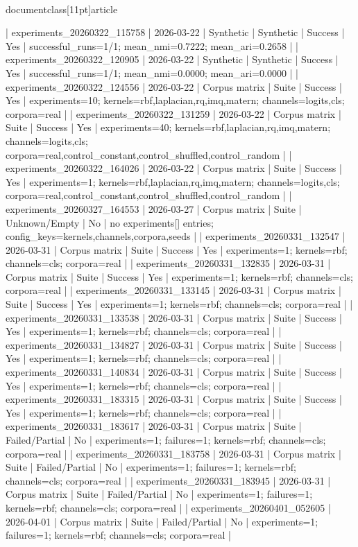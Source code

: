 \\documentclass[11pt]{article}
\begin{document}
\begin{CodeBlock}
| experiments_20260322_115758 | 2026-03-22 | Synthetic | Synthetic | Success | Yes | successful_runs=1/1; mean_nmi=0.7222; mean_ari=0.2658 |
| experiments_20260322_120905 | 2026-03-22 | Synthetic | Synthetic | Success | Yes | successful_runs=1/1; mean_nmi=0.0000; mean_ari=0.0000 |
| experiments_20260322_124556 | 2026-03-22 | Corpus matrix | Suite | Success | Yes | experiments=10; kernels=rbf,laplacian,rq,imq,matern; channels=logits,cls; corpora=real |
| experiments_20260322_131259 | 2026-03-22 | Corpus matrix | Suite | Success | Yes | experiments=40; kernels=rbf,laplacian,rq,imq,matern; channels=logits,cls; corpora=real,control_constant,control_shuffled,control_random |
| experiments_20260322_164026 | 2026-03-22 | Corpus matrix | Suite | Success | Yes | experiments=1; kernels=rbf,laplacian,rq,imq,matern; channels=logits,cls; corpora=real,control_constant,control_shuffled,control_random |
| experiments_20260327_164553 | 2026-03-27 | Corpus matrix | Suite | Unknown/Empty | No | no experiments[] entries; config_keys=kernels,channels,corpora,seeds |
| experiments_20260331_132547 | 2026-03-31 | Corpus matrix | Suite | Success | Yes | experiments=1; kernels=rbf; channels=cls; corpora=real |
| experiments_20260331_132835 | 2026-03-31 | Corpus matrix | Suite | Success | Yes | experiments=1; kernels=rbf; channels=cls; corpora=real |
| experiments_20260331_133145 | 2026-03-31 | Corpus matrix | Suite | Success | Yes | experiments=1; kernels=rbf; channels=cls; corpora=real |
| experiments_20260331_133538 | 2026-03-31 | Corpus matrix | Suite | Success | Yes | experiments=1; kernels=rbf; channels=cls; corpora=real |
| experiments_20260331_134827 | 2026-03-31 | Corpus matrix | Suite | Success | Yes | experiments=1; kernels=rbf; channels=cls; corpora=real |
| experiments_20260331_140834 | 2026-03-31 | Corpus matrix | Suite | Success | Yes | experiments=1; kernels=rbf; channels=cls; corpora=real |
| experiments_20260331_183315 | 2026-03-31 | Corpus matrix | Suite | Success | Yes | experiments=1; kernels=rbf; channels=cls; corpora=real |
| experiments_20260331_183617 | 2026-03-31 | Corpus matrix | Suite | Failed/Partial | No | experiments=1; failures=1; kernels=rbf; channels=cls; corpora=real |
| experiments_20260331_183758 | 2026-03-31 | Corpus matrix | Suite | Failed/Partial | No | experiments=1; failures=1; kernels=rbf; channels=cls; corpora=real |
| experiments_20260331_183945 | 2026-03-31 | Corpus matrix | Suite | Failed/Partial | No | experiments=1; failures=1; kernels=rbf; channels=cls; corpora=real |
| experiments_20260401_052605 | 2026-04-01 | Corpus matrix | Suite | Failed/Partial | No | experiments=1; failures=1; kernels=rbf; channels=cls; corpora=real |

\end{CodeBlock}
\end{document}
